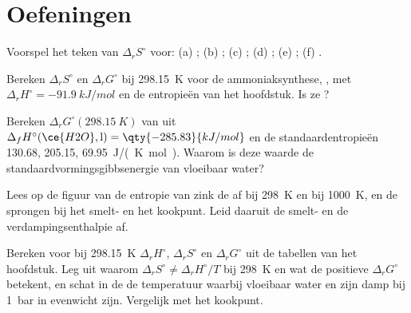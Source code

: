 \section{Oefeningen}

\begin{exercise}[$\star$]\label{exo:b2:reaction-free-energy:1}
Voorspel het teken van $\Delta_r S^\circ$ voor: (a) ;
(b) ; (c) ;
(d) ; (e) ;
(f) .
\end{exercise}

\begin{exercise}[$\star$]\label{exo:b2:reaction-free-energy:2}
Bereken $\Delta_r S^\circ$ en $\Delta_r G^\circ$ bij \qty{298.15}{K} voor de
ammoniaksynthese, , met $\Delta_r
H^\circ = \qty{-91.9}{kJ/mol}$ en de entropieën van het hoofdstuk. Is ze
?
\end{exercise}

\begin{exercise}[$\star$]\label{exo:b2:reaction-free-energy:3}
Bereken $\Delta_r G^\circ(\qty{298.15}{K})$ van  uit $\Delta_f H^\circ(\ce{H2O}, \text{l}) = \qty{-285.83}{kJ/mol}$
en de standaardentropieën  130.68,  205.15,
 \qty{69.95}{J/(K.mol)}. Waarom is deze waarde de
standaardvormingsgibbsenergie van vloeibaar water?
\end{exercise}

\begin{exercise}[$\star$]\label{exo:b2:reaction-free-energy:4}
Lees op de figuur van de entropie van zink de  af bij
\qty{298}{K} en bij \qty{1000}{K}, en de sprongen bij het smelt- en het
kookpunt. Leid daaruit de smelt- en de verdampingsenthalpie af.
\end{exercise}

\begin{exercise}[$\star\star$]\label{exo:b2:reaction-free-energy:5}
Bereken voor  bij \qty{298.15}{K} $\Delta_r H^\circ$,
$\Delta_r S^\circ$ en $\Delta_r G^\circ$ uit de tabellen van het hoofdstuk.
Leg uit waarom $\Delta_r S^\circ \neq \Delta_r H^\circ/T$ bij \qty{298}{K} en wat
de positieve $\Delta_r G^\circ$ betekent, en schat in de  de temperatuur waarbij vloeibaar water en zijn damp bij
\qty{1}{bar} in evenwicht zijn. Vergelijk met het kookpunt.
\end{exercise}

